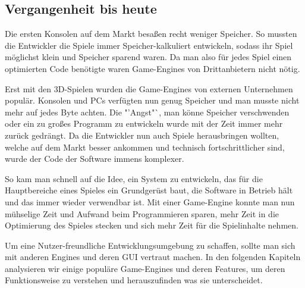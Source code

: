 \subsection{Vergangenheit bis heute}
\label{vergangenheit}
Die ersten Konsolen auf dem Markt besaßen recht weniger Speicher. So mussten die Entwickler die Spiele immer Speicher-kalkuliert entwickeln, sodass ihr Spiel möglichst klein und Speicher sparend waren. Da man also für jedes Spiel einen optimierten Code benötigte waren Game-Engines von Drittanbietern nicht nötig.

Erst mit den 3D-Spielen wurden die Game-Engines von externen Unternehmen populär. Konsolen und PCs verfügten nun genug Speicher %
und man musste nicht mehr auf jedes Byte achten. Die "'Angst"`, man könne Speicher verschwenden oder ein zu großes Programm zu entwickeln wurde mit der Zeit immer mehr zurück gedrängt.
Da die Entwickler nun auch Spiele herausbringen wollten, welche auf dem Markt besser ankommen und technisch fortschrittlicher sind, wurde der Code der Software immens komplexer.

So kam man schnell auf die Idee, ein System zu entwickeln, das für die Hauptbereiche eines Spieles ein Grundgerüst baut, die Software in Betrieb hält und das immer wieder verwendbar ist. Mit einer Game-Engine konnte man nun mühselige Zeit und Aufwand beim Programmieren sparen, mehr Zeit in die Optimierung des Spieles stecken und sich mehr Zeit für die Spielinhalte nehmen. 

Um eine Nutzer-freundliche Entwicklungsumgebung zu schaffen, sollte man sich mit anderen Engines und deren GUI vertraut machen. In den folgenden Kapiteln analysieren wir einige populäre Game-Engines und deren Features, um deren Funktionsweise zu verstehen und herauszufinden was sie unterscheidet.